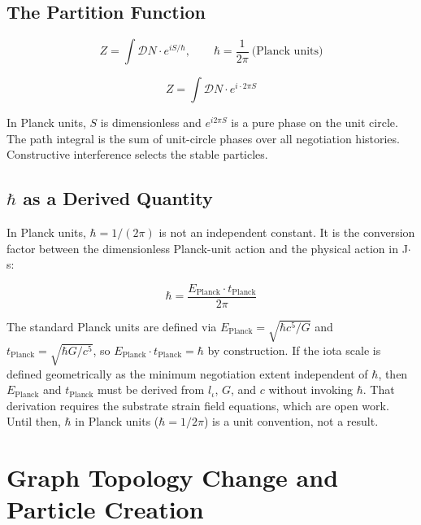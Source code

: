 \documentclass[11pt,letterpaper]{article}
\begin{document}
\subsection{The Partition Function}
\label{sec:org87946fb}

\begin{equation}
Z = \int \mathcal{D}N \cdot e^{iS/\hbar}, \qquad \hbar = \frac{1}{2\pi}\ \text{(Planck units)}
\end{equation}

\begin{equation}
Z = \int \mathcal{D}N \cdot e^{i \cdot 2\pi S}
\end{equation}

In Planck units, \(S\) is dimensionless and \(e^{i2\pi S}\) is a pure phase on the unit circle. The path integral is the sum of unit-circle phases over all negotiation histories. Constructive interference selects the stable particles.

\subsection{\(\hbar\) as a Derived Quantity}
\label{sec:org36472a2}

In Planck units, \(\hbar = 1/(2\pi)\) is not an independent constant. It is the conversion factor between the dimensionless Planck-unit action and the physical action in J\(\cdot\)s:

\begin{equation}
\hbar = \frac{E_\text{Planck} \cdot t_\text{Planck}}{2\pi}
\end{equation}

The standard Planck units are defined via \(E_\text{Planck} = \sqrt{\hbar c^5/G}\) and \(t_\text{Planck} = \sqrt{\hbar G/c^5}\), so \(E_\text{Planck} \cdot t_\text{Planck} = \hbar\) by construction. If the iota scale is defined geometrically as the minimum negotiation extent independent of \(\hbar\), then \(E_\text{Planck}\) and \(t_\text{Planck}\) must be derived from \(l_\iota\), \(G\), and \(c\) without invoking \(\hbar\). That derivation requires the substrate strain field equations, which are open work. Until then, \(\hbar\) in Planck units (\(\hbar = 1/2\pi\)) is a unit convention, not a result.

\section{Graph Topology Change and Particle Creation}
\label{sec:org9ee436c}
\end{document}
